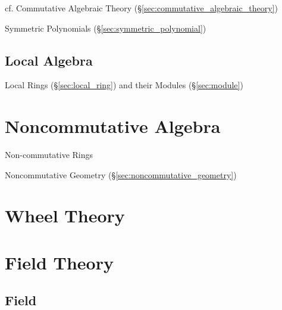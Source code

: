 \begin{itemize}
\fist cf. Commutative Algebraic Theory
(\S\ref{sec:commutative_algebraic_theory})

\fist Symmetric Polynomials (\S\ref{sec:symmetric_polynomial})



\subsection{Local Algebra}\label{sec:local_algebra}

Local Rings (\S\ref{sec:local_ring}) and their Modules (\S\ref{sec:module})



\section{Noncommutative Algebra}\label{sec:noncommutative_algebra}

Non-commutative Rings

Noncommutative Geometry (\S\ref{sec:noncommutative_geometry})



\section{Wheel Theory}\label{sec:wheel_theory}




\section{Field Theory}\label{sec:field_theory}

\subsection{Field}\label{sec:field}


\end{itemize}
